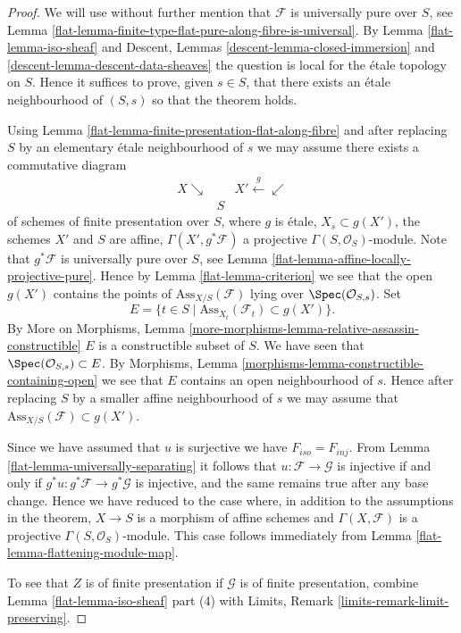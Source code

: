 \begin{proof}

We will use without further mention that $\mathcal{F}$ is universally pure
over $S$, see
Lemma \ref{flat-lemma-finite-type-flat-pure-along-fibre-is-universal}.
By
Lemma \ref{flat-lemma-iso-sheaf}
and
Descent, Lemmas \ref{descent-lemma-closed-immersion} and
\ref{descent-lemma-descent-data-sheaves}
the question is local for the \'etale topology on $S$.
Hence it suffices to prove, given $s \in S$, that there exists
an \'etale neighbourhood of $(S, s)$ so that the theorem holds.

\medskip\noindent
Using
Lemma \ref{flat-lemma-finite-presentation-flat-along-fibre}
and after replacing $S$ by an elementary \'etale neighbourhood of $s$
we may assume there exists a commutative diagram
$$
\begin{array}{ccc}X \searrow &  & X' \overset{g}{\longleftarrow}\swarrow \\  & S & \end{array}
$$
of schemes of finite presentation over $S$,
where $g$ is \'etale, $X_s \subset g(X')$, the schemes $X'$ and $S$ are affine,
$\Gamma(X', g^*\mathcal{F})$ a projective $\Gamma(S, \mathcal{O}_S)$-module.
Note that $g^*\mathcal{F}$ is universally pure over $S$, see
Lemma \ref{flat-lemma-affine-locally-projective-pure}.
Hence by
Lemma \ref{flat-lemma-criterion}
we see that the open $g(X')$ contains the points of
$\text{Ass}_{X/S}(\mathcal{F})$ lying over $\Spec(\mathcal{O}_{S, s})$.
Set
$$
E = \{t \in S \mid \text{Ass}_{X_t}(\mathcal{F}_t) \subset g(X') \}.
$$
By
More on Morphisms,
Lemma \ref{more-morphisms-lemma-relative-assassin-constructible}
$E$ is a constructible subset of $S$. We have seen that
$\Spec(\mathcal{O}_{S, s}) \subset E$. By
Morphisms, Lemma \ref{morphisms-lemma-constructible-containing-open}
we see that $E$ contains an open neighbourhood of $s$. Hence after
replacing $S$ by a smaller affine neighbourhood of $s$ we may assume that
$\text{Ass}_{X/S}(\mathcal{F}) \subset g(X')$.

\medskip\noindent
Since we have assumed that $u$ is surjective we have $F_{iso} = F_{inj}$. From
Lemma \ref{flat-lemma-universally-separating}
it follows that $u : \mathcal{F} \to \mathcal{G}$ is injective if and only if
$g^*u : g^*\mathcal{F} \to g^*\mathcal{G}$ is injective, and the same remains
true after any base change. Hence we have reduced to the case where,
in addition to the assumptions in the theorem, $X \to S$ is a morphism of
affine schemes and $\Gamma(X, \mathcal{F})$ is a projective
$\Gamma(S, \mathcal{O}_S)$-module. This case follows immediately from
Lemma \ref{flat-lemma-flattening-module-map}.

\medskip\noindent
To see that $Z$ is of finite presentation if $\mathcal{G}$ is of finite
presentation, combine
Lemma \ref{flat-lemma-iso-sheaf} part (4)
with
Limits, Remark \ref{limits-remark-limit-preserving}.
\end{proof}


